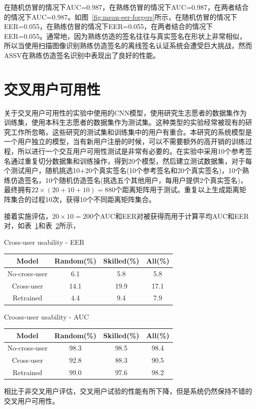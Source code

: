在随机仿冒的情况下AUC=0.987，在熟练仿冒的情况下AUC=0.987，在两者结合的情况下AUC=0.987。如图~\ref{fig:mean-eer-forgers}所示，在随机仿冒的情况下EER=0.055，在熟练仿冒的情况下EER=0.055，在两者结合的情况下EER=0.055。通常地，因为熟练仿造的签名往往与真实签名在形状上非常相似，所以当使用扫描图像识别熟练仿造签名的离线签名认证系统会遭受巨大挑战，然而ASSV在熟练仿造签名识别中表现出了良好的性能。

\section{交叉用户可用性}

关于交叉用户可用性的实验中使用的CNN模型，使用研究生志愿者的数据集作为训练集，使用本科生志愿者的数据集作为测试集。这种类型的实验经常被现有的研究工作所忽略，这些研究的测试集和训练集中的用户有重合。本研究的系统模型是一个用户独立的模型，当有新用户注册的时候，可以不需要额外的高开销的训练过程，所以进行一个交互用户可用性测试是非常有必要的。在实验中采用10个参考签名通过重复切分数据集和训练操作，得到20个模型，然后建立测试数据集，对于每个测试用户，随机挑选10+20个真实签名(10个参考签名和20个真实签名)，10个熟练仿造签名，10个随机仿造签名(挑选五个其他用户，每用户提供2个真实签名)，最终拥有$22\times (20+10+10)=880$个距离矩阵用于测试。重复以上生成距离矩阵集合的过程10次，获得10个不同距离矩阵集合。

接着实施评估，$20\times 10=200$个AUC和EER对被获得而用于计算平均AUC和EER对，如表~\ref{table:cross-eer}和表~\ref{table:cross-auc}所示，
\begin{table}[ht]
  \centering
    {Cross-user usability - EER}
    \label{table:cross-eer}
    \begin{tabular}{c c c c}
      \hline\hline 
      Model & Random(\%) & Skilled(\%) & All(\%) \\ 
      \hline 
      No-cross-user & 6.1 & 5.8 & 5.8 \\
      Cross-user & 14.1 & 19.9 & 17.1 \\
      Retrained & 4.4 & 9.4 & 7.9 \\
      \hline 
    \end{tabular}
\end{table}
\begin{table}[ht]
  \centering
  {Crooss-user usability - AUC} 
  \label{table:cross-auc} 
  \begin{tabular}{c c c c} 
    \hline\hline 
    Model & Random(\%) & Skilled(\%) & All(\%) \\ 
    \hline 
    No-cross-user & 98.3 & 98.5 & 98.4 \\
    Cross-user & 92.8 & 88.3 & 90.5 \\
    Retrained & 99.0 & 97.6 & 98.2 \\
    \hline 
  \end{tabular}
\end{table}
相比于非交叉用户评估，交叉用户试验的性能有所下降，但是系统仍然保持不错的交叉用户可用性。

